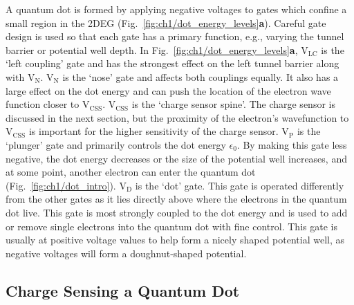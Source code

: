 A quantum dot is formed by applying negative voltages to gates which confine a small region in the 2DEG (Fig.~\ref{fig:ch1/dot_energy_levels}\textbf{a}).
Careful gate design is used so that each gate has a primary function, e.g., varying the tunnel barrier or potential well depth. In Fig.~\ref{fig:ch1/dot_energy_levels}\textbf{a}, $\mathrm{V_{LC}}$ is the `left coupling' gate and has the strongest effect on the left tunnel barrier along with $\mathrm{V_{N}}$. $\mathrm{V_{N}}$ is the `nose' gate and affects both couplings equally. It also has a large effect on the dot energy and can push the location of the electron wave function closer to $\mathrm{V_{CSS}}$. $\mathrm{V_{CSS}}$ is the `charge sensor spine'. The charge sensor is discussed in the next section, but the proximity of the electron's wavefunction to $\mathrm{V_{CSS}}$ is important for the higher sensitivity of the charge sensor. $\mathrm{V_{P}}$ is the `plunger' gate and primarily controls the dot energy $\epsilon_0$. By making this gate less negative, the dot energy decreases or the size of the potential well increases, and at some point, another electron can enter the quantum dot (Fig.~\ref{fig:ch1/dot_intro}). $\mathrm{V_{D}}$ is the `dot' gate. This gate is operated differently from the other gates as it lies directly above where the electrons in the quantum dot live. This gate is most strongly coupled to the dot energy and is used to add or remove single electrons into the quantum dot with fine control. This gate is usually at positive voltage values to help form a nicely shaped potential well, as negative voltages will form a doughnut-shaped potential. 





\afterpage{\clearpage}
\subsection{Charge Sensing a Quantum Dot}


